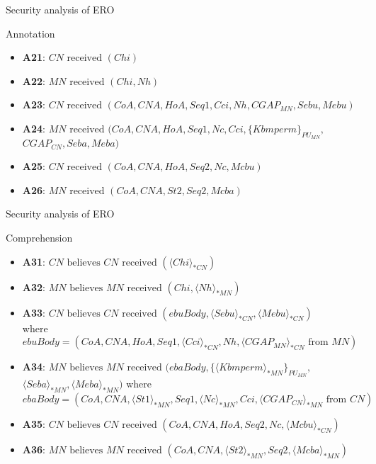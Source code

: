 \documentclass[10pt]{beamer}
\newcommand{\xtext}[1]{\text{ #1 }}
\begin{document}
\begin{frame}{Security analysis of ERO}	
	\begin{block}{Annotation}
		\begin{itemize}
			\item \textbf{A21}: $CN \xtext{received} (Chi)$
			\item \textbf{A22}: $MN \xtext{received} (Chi, Nh)$
			\item \textbf{A23}: $CN \xtext{received} (CoA, CNA, HoA,Seq1,Cci,Nh,CGAP_{MN}, Sebu, Mebu)$
			\item \textbf{A24}: {\small $MN \xtext{received} (CoA, CNA, HoA, Seq1,Nc,Cci,\{Kbmperm\}_{PU_{MN}},$\\\hspace{0.9cm}$CGAP_{CN}, Seba, Meba)$}
			\item \textbf{A25}: $CN \xtext{received} (CoA, CNA, HoA, Seq2,Nc,Mcbu)$
			\item \textbf{A26}: $MN \xtext{received} (CoA, CNA, St2,Seq2,Mcba)$
		\end{itemize}
	\end{block}
\end{frame}
\begin{frame}{Security analysis of ERO}
	\begin{block}{Comprehension}
		\begin{itemize}
			\item \textbf{A31}: $CN \xtext{believes} CN \xtext{received} (\langle Chi\rangle_{*CN})$
			\item \textbf{A32}: $MN \xtext{believes} MN \xtext{received} (Chi, \langle Nh\rangle_{*MN})$
			\item \textbf{A33}: $CN \xtext{believes} CN \xtext{received} (ebuBody, \langle Sebu\rangle_{*CN}, \langle Mebu\rangle_{*CN})$\\{\small where $ebuBody = (CoA, CNA, HoA, Seq1, \langle Cci\rangle_{*CN}, Nh, \langle CGAP_{MN}\rangle_{*CN} \xtext{from} MN)$}
			\item \textbf{A34}: {\small $MN \xtext{believes} MN \xtext{received} (ebaBody, \{\langle Kbmperm\rangle_{*MN}\}_{PU_{MN}},$\\$ \langle Seba\rangle_{*MN}, \langle Meba\rangle_{*MN})$ \hspace{2.0cm}where $ebaBody = (CoA, CNA, \langle St1\rangle_{*MN}, Seq1, \langle Nc\rangle_{*MN}, Cci, \langle CGAP_{CN}\rangle_{*MN} \xtext{from} CN)$}
			\item \textbf{A35}: {\small $CN \xtext{believes} CN \xtext{received} (CoA, CNA, HoA, Seq2, Nc, \langle Mcbu\rangle_{*CN})$}
			\item \textbf{A36}: {\small$MN \xtext{believes} MN \xtext{received} (CoA, CNA, \langle St2\rangle_{*MN}, Seq2, \langle Mcba\rangle_{*MN})$}
		\end{itemize}
	\end{block}
\end{frame}
\end{document}
